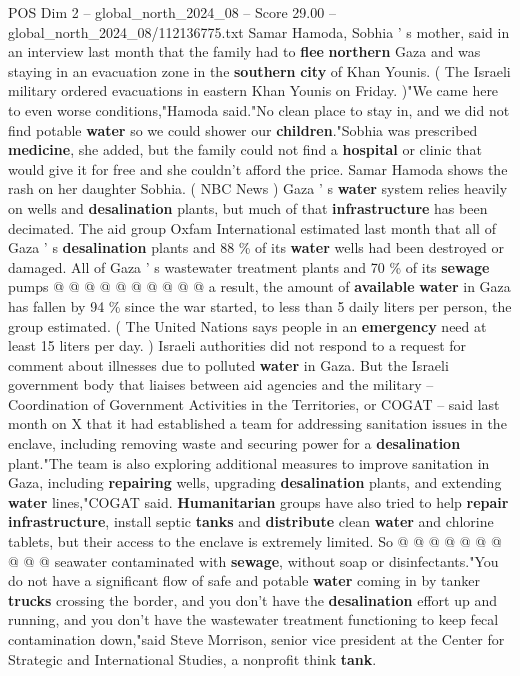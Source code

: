 \begin{textsample}{POS Dim 2 – global\_north\_2024\_08 – Score 29.00 – global\_north\_2024\_08/112136775.txt}  \label{ex:f2_pos_395}
Samar Hamoda, Sobhia ' s mother, said in an interview last month that the family had to \textbf{flee} \textbf{northern} Gaza and was staying in an evacuation zone in the \textbf{southern} \textbf{city} of Khan Younis. ( The Israeli military ordered evacuations in eastern Khan Younis on Friday. )"We came here to even worse conditions,"Hamoda said."No clean place to stay in, and we did not find potable \textbf{water} so we could shower our \textbf{children}."Sobhia was prescribed \textbf{medicine}, she added, but the family could not find a \textbf{hospital} or clinic that would give it for free and she couldn't afford the price.
Samar Hamoda shows the rash on her daughter Sobhia. ( NBC News ) Gaza ' s \textbf{water} system relies heavily on wells and \textbf{desalination} plants, but much of that \textbf{infrastructure} has been decimated.
The aid group Oxfam International estimated last month that all of Gaza ' s \textbf{desalination} plants and 88 \% of its \textbf{water} wells had been destroyed or damaged.
All of Gaza ' s wastewater treatment plants and 70 \% of its \textbf{sewage} pumps @ @ @ @ @ @ @ @ @ @ a result, the amount of \textbf{available} \textbf{water} in Gaza has fallen by 94 \% since the war started, to less than 5 daily liters per person, the group estimated. ( The United Nations says people in an \textbf{emergency} need at least 15 liters per day. ) Israeli authorities did not respond to a request for comment about illnesses due to polluted \textbf{water} in Gaza.
But the Israeli government body that liaises between aid agencies and the military -- Coordination of Government Activities in the Territories, or COGAT -- said last month on X that it had established a team for addressing sanitation issues in the enclave, including removing waste and securing power for a \textbf{desalination} plant."The team is also exploring additional measures to improve sanitation in Gaza, including \textbf{repairing} wells, upgrading \textbf{desalination} plants, and extending \textbf{water} lines,"COGAT said. \textbf{Humanitarian} groups have also tried to help \textbf{repair} \textbf{infrastructure}, install septic \textbf{tanks} and \textbf{distribute} clean \textbf{water} and chlorine tablets, but their access to the enclave is extremely limited.
So @ @ @ @ @ @ @ @ @ @ seawater contaminated with \textbf{sewage}, without soap or disinfectants."You do not have a significant flow of safe and potable \textbf{water} coming in by tanker \textbf{trucks} crossing the border, and you don't have the \textbf{desalination} effort up and running, and you don't have the wastewater treatment functioning to keep fecal contamination down,"said Steve Morrison, senior vice president at the Center for Strategic and International Studies, a nonprofit think \textbf{tank}.

\end{textsample}

